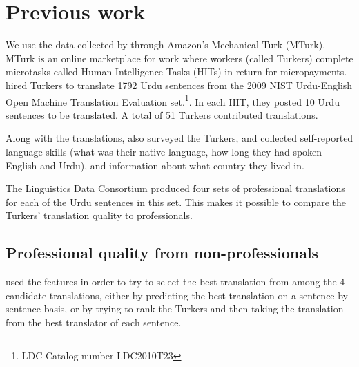 \documentclass[11pt]{article}
\begin{document}
\section{Previous work}


We use the data collected by   through Amazon's Mechanical Turk (MTurk). MTurk is an online marketplace for work where workers (called Turkers) complete microtasks called Human Intelligence Tasks (HITs) in return for micropayments.   hired Turkers to translate 1792 Urdu sentences 
from the  2009 NIST Urdu-English Open Machine Translation Evaluation set.\footnote{LDC Catalog number LDC2010T23}. In each HIT, they posted 10 Urdu sentences to be translated. A total of 51 Turkers contributed translations. 

Along with the translations,  also surveyed the Turkers, and collected self-reported language skills (what was their native language, how long they had spoken English and Urdu), and information about what country they lived in.

The Linguistics Data Consortium produced four sets of professional translations for each  of the Urdu sentences in this set. This makes it possible to compare the Turkers' translation quality to professionals. 

\subsection{Professional quality from non-professionals}

  used the features in order to try to select the best translation from among the 4 candidate translations, either by predicting the best translation on a sentence-by-sentence basis, or by trying to rank the Turkers and then taking the translation from the best translator of each sentence. 
\end{document}
